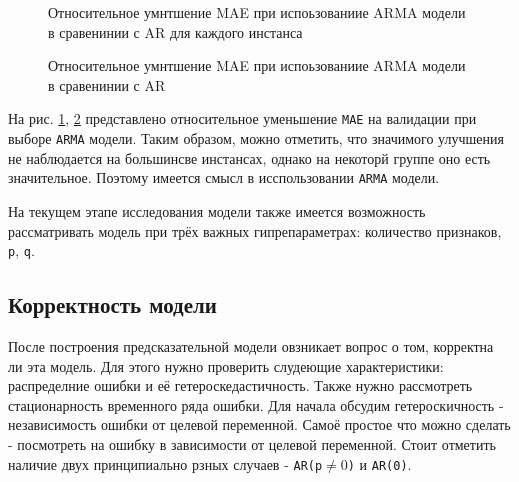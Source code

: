 \documentclass[14pt, a4paper]{extarticle}
\begin{document}
	\begin{figure}[!htb]
		\centerline{}
		\caption{Относительное умнтшение MAE при испоьзованиие ARMA модели в сравенинии с AR для каждого инстанса}
		\label{fig:arma_vs_ar_hm}
	\end{figure}		
	
	\begin{figure}[!h]
		\centerline{}
		\caption{Относительное умнтшение MAE при испоьзованиие ARMA модели в сравенинии с AR}
		\label{fig:arma_vs_ar_hist}
	\end{figure}		
	
На рис. \ref{fig:arma_vs_ar_hm}, \ref{fig:arma_vs_ar_hist} представлено относительное уменьшение \texttt{MAE} на валидации при выборе \texttt{ARMA} модели. 
Таким образом, можно отметить, что значимого улучшения не наблюдается на большинсве инстансах, однако на некоторй группе оно есть значительное.
Поэтому имеется смысл в исспользовании \texttt{ARMA} модели.	
	
На текущем этапе исследования модели также имеется возможность рассматривать модель при трёх важных гипрепараметрах: количество признаков, \texttt{p}, \texttt{q}.
	
	\subsection{Корректность модели}
После построения предсказательной модели овзникает вопрос о том, корректна ли эта модель. Для этого нужно проверить слудеющие характеристики: распределние ошибки и её гетероскедастичность. Также нужно рассмотреть стационарность временного ряда ошибки. 
Для начала обсудим гетероскичность - независимость ошибки от целевой переменной.
Самоё простое что можно сделать - посмотреть на ошибку в зависимости от целевой переменной.
Стоит отметить наличие двух принципиально рзных случаев - \texttt{AR(p$\neq0$)} и \texttt{AR(0)}.
\end{document}
